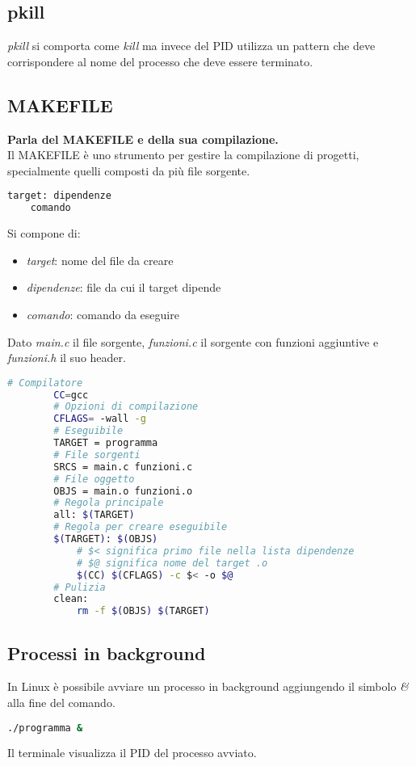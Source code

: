 \subsection{pkill}
\textit{pkill} si comporta come \textit{kill} ma invece del PID utilizza un pattern che deve corrispondere al nome del processo che deve essere terminato.

\subsection{MAKEFILE}
\textbf{Parla del MAKEFILE e della sua compilazione.}\\
Il MAKEFILE è uno strumento per gestire la compilazione di progetti, specialmente quelli composti da più file sorgente.
\begin{lstlisting}[language=BASH]
	target: dipendenze
	comando
\end{lstlisting}
Si compone di:
\begin{itemize}
	\item \textit{target}: nome del file da creare
	\item \textit{dipendenze}: file da cui il target dipende
	\item \textit{comando}: comando da eseguire
\end{itemize}
\begin{example}[MAKEFILE]
	Dato \textit{main.c} il file sorgente, \textit{funzioni.c} il sorgente con funzioni aggiuntive e \textit{funzioni.h} il suo header.
	\begin{lstlisting}[language=BASH]
		# Compilatore
		CC=gcc
		# Opzioni di compilazione
		CFLAGS= -wall -g
		# Eseguibile
		TARGET = programma
		# File sorgenti
		SRCS = main.c funzioni.c
		# File oggetto
		OBJS = main.o funzioni.o
		# Regola principale
		all: $(TARGET)
		# Regola per creare eseguibile
		$(TARGET): $(OBJS)
			# $< significa primo file nella lista dipendenze
			# $@ significa nome del target .o
			$(CC) $(CFLAGS) -c $< -o $@
		# Pulizia
		clean:
			rm -f $(OBJS) $(TARGET)
	\end{lstlisting}
\end{example}

\subsection{Processi in background}
In Linux è possibile avviare un processo in background aggiungendo il simbolo \textit{\&} alla fine del comando.
\begin{lstlisting}[language=BASH]
	./programma &
\end{lstlisting}
Il terminale visualizza il PID del processo avviato.

